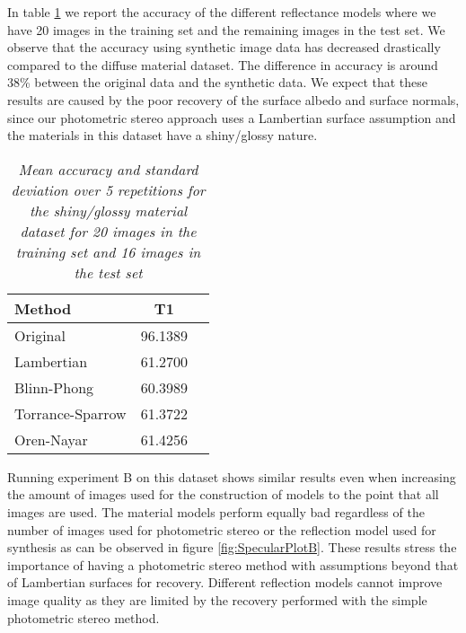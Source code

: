 In table \ref{tab:SpecularResultsA} we report the accuracy of the different reflectance models where we have 20 images in the training set and the remaining images in the test set. We observe that the accuracy using synthetic image data has decreased drastically compared to the diffuse material dataset. The difference in accuracy is around 38\% between the original data and the synthetic data. We expect that these results are caused by the poor recovery of the surface albedo and surface normals, since our photometric stereo approach uses a Lambertian surface assumption and the materials in this dataset have a shiny/glossy nature. 

\begin{table}
	\center
	\begin{tabular}{l|c|r}
	Method 				&	T1\\
	\hline
	Original			&	96.1389\\
	Lambertian 			&	61.2700\\
	Blinn-Phong 		& 	60.3989\\
	Torrance-Sparrow 	&	61.3722\\
	Oren-Nayar 			&	61.4256\\
	\end{tabular}
	\caption{{\it Mean accuracy and standard deviation over 5 repetitions for the shiny/glossy material dataset for 20 images in the training set and 16 images in the test set}}
	\label{tab:SpecularResultsA}
\end{table}

Running experiment B on this dataset shows similar results even when increasing the amount of images used for the construction of models to the point that all images are used. The material models perform equally bad regardless of the number of images used for photometric stereo or the reflection model used for synthesis as can be observed in figure \ref{fig:SpecularPlotB}. These results stress the importance of having a photometric stereo method with assumptions beyond that of Lambertian surfaces for recovery. Different reflection models cannot improve image quality as they are limited by the recovery performed with the simple photometric stereo method.

